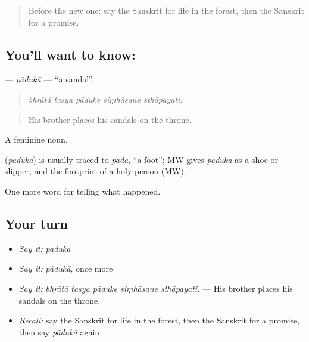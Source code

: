 \label{lesson:SA-C337-paduka}



\begin{quote}
Before the new one: say the Sanskrit for life in the forest, then the Sanskrit for a promise.
\end{quote}

\subsection*{You'll want to know: }
\textbf{} — \emph{pādukā} — \textquotedblleft{}a sandal\textquotedblright{}.

\begin{quote}
    
\end{quote}

\begin{quote}
\emph{bhrātā tasya pāduke siṃhāsane sthāpayati.}
\end{quote}

\begin{quote}
His brother places his sandals on the throne.
\end{quote}

A feminine noun.

\begin{cousinweb}
\textbf{} (\emph{pādukā}) is usually traced to \emph{pāda}, \textquotedblleft{}a foot\textquotedblright{}; MW gives \emph{pādukā} as a shoe or slipper, and the footprint of a holy person (MW).
\end{cousinweb}

\begin{grammarlens}[title={What you've built}]
One more word for telling what happened.
\end{grammarlens}

\subsection*{Your turn}
\begin{itemize}
\raggedright
  \item \emph{Say it:} \emph{pādukā}
  \item \emph{Say it:} \emph{pādukā}, once more
  \item \emph{Say it:} \emph{bhrātā tasya pāduke siṃhāsane sthāpayati.} — His brother places his sandals on the throne.
  \item \emph{Recall:} say the Sanskrit for life in the forest, then the Sanskrit for a promise, then say \emph{pādukā} again
\end{itemize}

